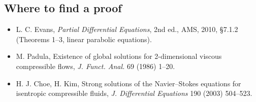 \subsection*{Where to find a proof}

\begin{itemize}
\item L. C. Evans, \emph{Partial Differential Equations}, 2nd ed., AMS, 2010, §7.1.2 (Theorems 1--3, linear parabolic equations).
\item M. Padula, Existence of global solutions for 2-dimensional viscous compressible flows, \emph{J. Funct. Anal.} 69 (1986) 1--20.
\item H. J. Choe, H. Kim, Strong solutions of the Navier--Stokes equations for isentropic compressible fluids, \emph{J. Differential Equations} 190 (2003) 504--523.
\end{itemize}

\neededfor
